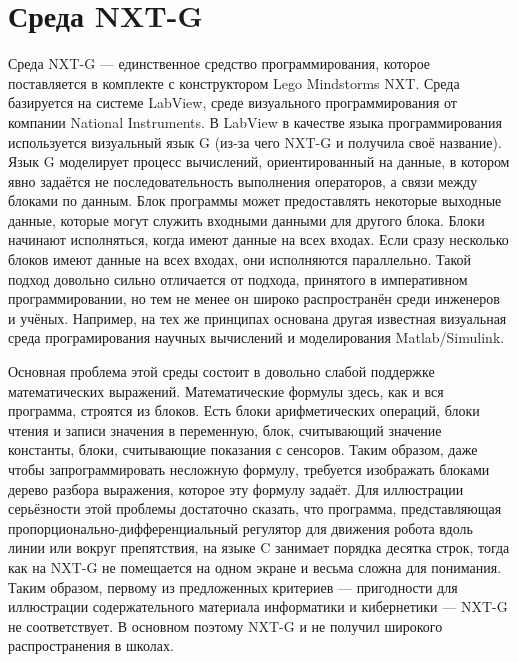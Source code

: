 \documentclass[a4paper]{article}
\begin{document}
\section{Среда NXT-G}
Среда NXT-G --- единственное средство программирования, которое поставляется в комплекте с конструктором Lego Mindstorms NXT. Среда базируется на системе LabView, среде визуального программирования от компании National Instruments. В LabView в качестве языка программирования используется визуальный язык G (из-за чего NXT-G и получила своё название). Язык G моделирует процесс вычислений, ориентированный на данные, в котором явно задаётся не последовательность выполнения операторов, а связи между блоками по данным. Блок программы может предоставлять некоторые выходные данные, которые могут служить входными данными для другого блока. Блоки начинают исполняться, когда имеют данные на всех входах. Если сразу несколько блоков имеют данные на всех входах, они исполняются параллельно. Такой подход довольно сильно отличается от подхода, принятого в императивном программировании, но тем не менее он широко распространён среди инженеров и учёных. Например, на тех же принципах основана другая известная визуальная среда програмирования научных вычислений и моделирования Matlab/Simulink.

Основная проблема этой среды состоит в довольно слабой поддержке математических выражений. Математические формулы здесь, как и вся программа, строятся из блоков. Есть блоки арифметических операций, блоки чтения и записи значения в переменную, блок, считывающий значение константы, блоки, считывающие показания с сенсоров. Таким образом, даже чтобы запрограммировать несложную формулу, требуется изображать блоками дерево разбора выражения, которое эту формулу задаёт. Для иллюстрации серьёзности этой проблемы достаточно сказать, что программа, представляющая пропорционально-дифференциальный регулятор для движения робота вдоль линии или вокруг препятствия, на языке C занимает порядка десятка строк, тогда как на NXT-G не помещается на одном экране и весьма сложна для понимания. Таким образом, первому из предложенных критериев --- пригодности для иллюстрации содержательного материала информатики и кибернетики --- NXT-G не соответствует. В основном поэтому NXT-G и не получил широкого распространения в школах.
\end{document}
